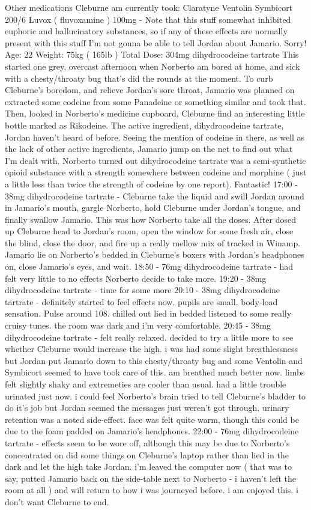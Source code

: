 \documentclass[12pt]{book}
\begin{document}
Other medications Cleburne am currently took: Claratyne Ventolin Symbicort 200/6 Luvox ( fluvoxamine ) 100mg - Note that this stuff somewhat inhibited euphoric and hallucinatory substances, so if any of these effects are normally present with this stuff I'm not gonna be able to tell Jordan about Jamario. Sorry! Age: 22 Weight: 75kg ( 165lb ) Total Dose: 304mg dihydrocodeine tartrate This started one grey, overcast afternoon when Norberto am bored at home, and sick with a chesty/throaty bug that's did the rounds at the moment. To curb Cleburne's boredom, and relieve Jordan's sore throat, Jamario was planned on extracted some codeine from some Panadeine or something similar and took that. Then, looked in Norberto's medicine cupboard, Cleburne find an interesting little bottle marked as Rikodeine. The active ingredient, dihydrocodeine tartrate, Jordan haven't heard of before. Seeing the mention of codeine in there, as well as the lack of other active ingredients, Jamario jump on the net to find out what I'm dealt with. Norberto turned out dihydrocodeine tartrate was a semi-synthetic opioid substance with a strength somewhere between codeine and morphine ( just a little less than twice the strength of codeine by one report). Fantastic! 17:00 - 38mg dihydrocodeine tartrate - Cleburne take the liquid and swill Jordan around in Jamario's mouth, gargle Norberto, hold Cleburne under Jordan's tongue, and finally swallow Jamario. This was how Norberto take all the doses. After dosed up Cleburne head to Jordan's room, open the window for some fresh air, close the blind, close the door, and fire up a really mellow mix of tracked in Winamp. Jamario lie on Norberto's bedded in Cleburne's boxers with Jordan's headphones on, close Jamario's eyes, and wait. 18:50 - 76mg dihydrocodeine tartrate - had felt very little to no effects Norberto decide to take more. 19:20 - 38mg dihydrocodeine tartrate - time for some more 20:10 - 38mg dihydrocodeine tartrate - definitely started to feel effects now. pupils are small. body-load sensation. Pulse around 108. chilled out lied in bedded listened to some really cruisy tunes. the room was dark and i'm very comfortable. 20:45 - 38mg dihydrocodeine tartrate - felt really relaxed. decided to try a little more to see whether Cleburne would increase the high. i was had some slight breathlessness but Jordan put Jamario down to this chesty/throaty bug and some Ventolin and Symbicort seemed to have took care of this. am breathed much better now. limbs felt slightly shaky and extremeties are cooler than usual. had a little trouble urinated just now. i could feel Norberto's brain tried to tell Cleburne's bladder to do it's job but Jordan seemed the messages just weren't got through. urinary retention was a noted side-effect. face was felt quite warm, though this could be due to the foam padded on Jamario's headphones. 22:00 - 76mg dihydrocodeine tartrate - effects seem to be wore off, although this may be due to Norberto's concentrated on did some things on Cleburne's laptop rather than lied in the dark and let the high take Jordan. i'm leaved the computer now ( that was to say, putted Jamario back on the side-table next to Norberto - i haven't left the room at all ) and will return to how i was journeyed before. i am enjoyed this. i don't want Cleburne to end. 
\end{document}
